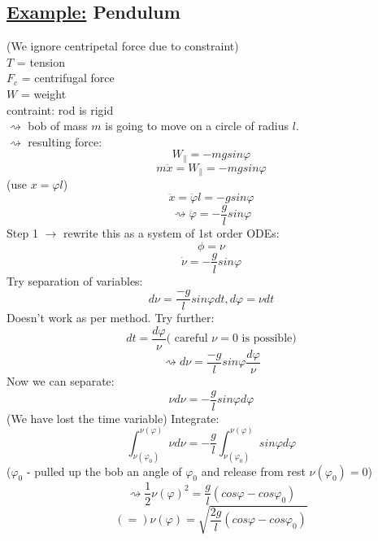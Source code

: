 \documentclass[a4paper, 12pt]{article}
\begin{document}
\subsection{\underline{Example:} Pendulum}
\begin{center}
\end{center}
(We ignore centripetal force due to constraint)\\
$T$ = tension\\
$F_c$ = centrifugal force\\
$W$ = weight\\
contraint: rod is rigid\\
$\rightsquigarrow$ bob of mass $m$ is going to move on  a circle of radius $l$.\\ 
$\rightsquigarrow$ resulting force: $$W_{\parallel} =  - mg sin \varphi$$  $$m\ddot{x} = W_{\parallel} =  - mg sin \varphi$$ (use $ x = \varphi l$) $$\ddot{x} = \ddot{\varphi} l = - g sin \varphi$$ $$\rightsquigarrow \ddot{\varphi} = - \frac{g}{l} sin \varphi $$
Step 1 $\rightarrow$ rewrite this as a system of 1st order ODEs: $$\phi = \nu$$ $$ \dot{\nu} = - \frac{g}{l} sin \varphi $$
Try separation of variables:
$$d \nu = \frac{-g}{l} sin \varphi dt, d \varphi = \nu dt$$
Doesn't work as per method. Try further:
$$dt = \frac{d \varphi}{\nu} \text{( careful $\nu = 0$ is possible)}$$
$$\rightsquigarrow d\nu =\frac{-g}{l} sin \varphi \frac{d \varphi}{\nu}$$
Now we can separate: $$\nu d\nu = -\frac{g}{l} sin \varphi d \varphi $$
(We have lost the time variable) Integrate: $$\int_{\nu(\varphi_0)}^{\nu(\varphi)} \nu d \nu = -\frac{g}{l}\int_{\nu(\varphi_0)}^{\nu(\varphi)} sin \varphi d \varphi$$
($\varphi_0$ - pulled up the bob an angle of $\varphi_0$ and release from rest $\nu(\varphi_0) = 0$)
$$\rightsquigarrow \frac{1}{2} \nu (\varphi)^2 = \frac{g}{l}(cos \varphi - cos \varphi_0)$$
$$(=) \nu(\varphi) = \sqrt{\frac{2g}{l}(cos \varphi - cos \varphi_0)}$$
\end{document}
